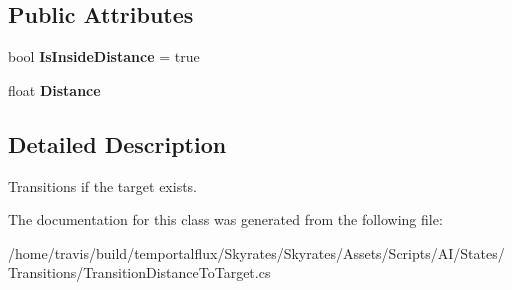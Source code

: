 \subsection*{Public Attributes}
\begin{DoxyCompactItemize}
\item 
\hypertarget{class_skyrates_1_1_a_i_1_1_state_1_1_transition_1_1_transition_distance_to_target_a7a34c12661190d3c582e9f80230f78d7}{bool {\bfseries Is\-Inside\-Distance} = true}\label{class_skyrates_1_1_a_i_1_1_state_1_1_transition_1_1_transition_distance_to_target_a7a34c12661190d3c582e9f80230f78d7}

\item 
\hypertarget{class_skyrates_1_1_a_i_1_1_state_1_1_transition_1_1_transition_distance_to_target_a0b8f1b5843a7bdc56afc79e2bf0865c1}{float {\bfseries Distance}}\label{class_skyrates_1_1_a_i_1_1_state_1_1_transition_1_1_transition_distance_to_target_a0b8f1b5843a7bdc56afc79e2bf0865c1}

\end{DoxyCompactItemize}


\subsection{Detailed Description}
Transitions if the target exists. 



The documentation for this class was generated from the following file\-:\begin{DoxyCompactItemize}
\item 
/home/travis/build/temportalflux/\-Skyrates/\-Skyrates/\-Assets/\-Scripts/\-A\-I/\-States/\-Transitions/Transition\-Distance\-To\-Target.\-cs\end{DoxyCompactItemize}
